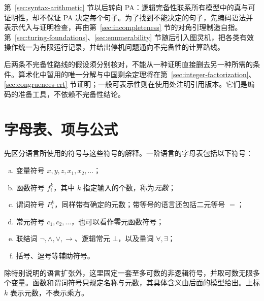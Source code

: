 \documentclass[lang=cn,a4paper,fontset=none,zihao=false,10pt,openany,twoside]{beautybook}
\numberwithin{algorithm}{chapter}
\begin{document}
第~\ref{sec:syntax-arithmetic} 节以后转向 PA：逻辑完备性联系所有模型中的真与可证明性，却不保证 PA 决定每个句子。为了找到不能决定的句子，先编码语法并表示代入与证明检查，再由第~\ref{sec:incompleteness} 节的对角引理制造自指。第~\ref{sec:turing-foundations}、\ref{sec:enumerability} 节随后引入图灵机，把各类有效操作统一为有限运行记录，并给出停机问题通向不完备性的计算路线。
\begin{center}
\end{center}
后两条不完备性路线的假设须分别核对，不能从一种证明直接删去另一种所需的条件。算术化中暂用的唯一分解与中国剩余定理将在第~\ref{sec:integer-factorization}、\ref{sec:congruences-crt} 节证明；一般可表示性则在使用处注明引用版本。它们是编码的准备工具，不依赖不完备性结论。

\section{字母表、项与公式}\label{sec:fo-syntax}
先区分语言所使用的符号与这些符号的解释。一阶语言的字母表包括以下符号：
\begin{enumerate}[(a)]
\item 变量符号 $x,y,z,x_1,x_2,\ldots$；
\item 函数符号 $f_i^k$，其中 $k$ 指定输入的个数，称为\emph{元数}；
\item 谓词符号 $P_i^k$，同样带有确定的元数；带等号的语言还包括二元等号 $=$；
\item 常元符号 $c_1,c_2,\ldots$，也可以看作零元函数符号；
\item 联结词 $\neg,\wedge,\vee,\to$、逻辑常元 $\bot$，以及量词 $\forall,\exists$；
\item 括号、逗号等辅助符号。
\end{enumerate}
除特别说明的语言扩张外，这里固定一套至多可数的非逻辑符号，并取可数无限多个变量。函数和谓词符号只规定名称与元数，其具体含义由后面的模型给出。上标 $k$ 表示元数，不表示乘方。
\end{document}
